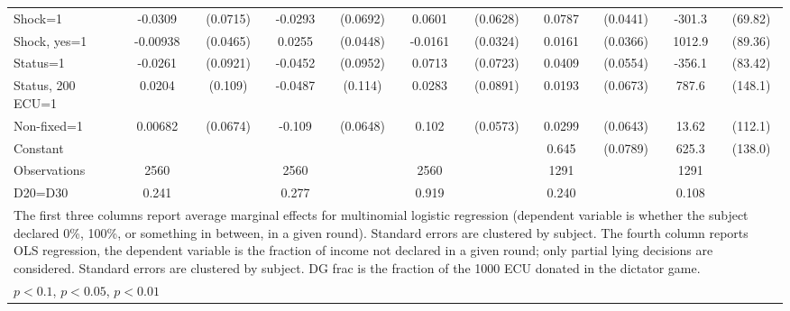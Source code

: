 \begin{tabular}{l|cccccc|cc|cc}
Shock=1         &  -0.0309         & (0.0715)&  -0.0293         & (0.0692)&   0.0601         & (0.0628)&   0.0787\sym{*}  & (0.0441)&   -301.3\sym{***}&  (69.82)\\
Shock, yes=1    & -0.00938         & (0.0465)&   0.0255         & (0.0448)&  -0.0161         & (0.0324)&   0.0161         & (0.0366)&   1012.9\sym{***}&  (89.36)\\
Status=1        &  -0.0261         & (0.0921)&  -0.0452         & (0.0952)&   0.0713         & (0.0723)&   0.0409         & (0.0554)&   -356.1\sym{***}&  (83.42)\\
Status, 200 ECU=1&   0.0204         &  (0.109)&  -0.0487         &  (0.114)&   0.0283         & (0.0891)&   0.0193         & (0.0673)&    787.6\sym{***}&  (148.1)\\
Non-fixed=1     &  0.00682         & (0.0674)&   -0.109\sym{*}  & (0.0648)&    0.102\sym{*}  & (0.0573)&   0.0299         & (0.0643)&    13.62         &  (112.1)\\
Constant        &                  &         &                  &         &                  &         &    0.645\sym{***}& (0.0789)&    625.3\sym{***}&  (138.0)\\
\hline
Observations    &     2560         &         &     2560         &         &     2560         &         &     1291         &         &     1291         &         \\
D20=D30         &    0.241         &         &    0.277         &         &    0.919         &         &    0.240         &         &    0.108         &         \\
\hline\hline
\multicolumn{11}{p{18cm}}{\tiny The first three columns report average marginal effects for multinomial logistic regression (dependent variable is whether the subject declared 0\%,  100\%, or something in between, in a given round). Standard errors are clustered by subject. The fourth column reports OLS regression, the dependent variable is the fraction of income not declared in a given round; only partial lying decisions are considered. Standard errors are clustered by subject. DG frac is the fraction of the 1000 ECU donated in the dictator game.}\\
\multicolumn{11}{l}{\tiny \sym{*} \(p<0.1\), \sym{**} \(p<0.05\), \sym{***} \(p<0.01\)}\\
\end{tabular}